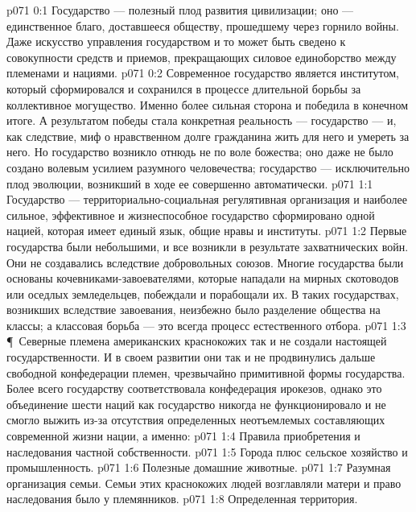 \vs p071 0:1 Государство --- полезный плод развития цивилизации; оно --- единственное благо, доставшееся обществу, прошедшему через горнило войны. Даже искусство управления государством и то может быть сведено к совокупности средств и приемов, прекращающих силовое единоборство между племенами и нациями.
\vs p071 0:2 Современное государство является институтом, который сформировался и сохранился в процессе длительной борьбы за коллективное могущество. Именно более сильная сторона и победила в конечном итоге. А результатом победы стала конкретная реальность --- государство --- и, как следствие, миф о нравственном долге гражданина жить для него и умереть за него. Но государство возникло отнюдь не по воле божества; оно даже не было создано волевым усилием разумного человечества; государство --- исключительно плод эволюции, возникший в ходе ее совершенно автоматически.
\vs p071 1:1 Государство --- территориально\hyp{}социальная регулятивная организация и наиболее сильное, эффективное и жизнеспособное государство сформировано одной нацией, которая имеет единый язык, общие нравы и институты.
\vs p071 1:2 Первые государства были небольшими, и все возникли в результате захватнических войн. Они не создавались вследствие добровольных союзов. Многие государства были основаны кочевниками\hyp{}завоевателями, которые нападали на мирных скотоводов или оседлых земледельцев, побеждали и порабощали их. В таких государствах, возникших вследствие завоевания, неизбежно было разделение общества на классы; а классовая борьба --- это всегда процесс естественного отбора.
\vs p071 1:3 \P\ Северные племена американских краснокожих так и не создали настоящей государственности. И в своем развитии они так и не продвинулись дальше свободной конфедерации племен, чрезвычайно примитивной формы государства. Более всего государству соответствовала конфедерация ирокезов, однако это объединение шести наций как государство никогда не функционировало и не смогло выжить из\hyp{}за отсутствия определенных неотъемлемых составляющих современной жизни нации, а именно:
\vs p071 1:4 \bibnobreakspace Правила приобретения и наследования частной собственности.
\vs p071 1:5 \bibnobreakspace Города плюс сельское хозяйство и промышленность.
\vs p071 1:6 \bibnobreakspace Полезные домашние животные.
\vs p071 1:7 \bibnobreakspace Разумная организация семьи. Семьи этих краснокожих людей возглавляли матери и право наследования было у племянников.
\vs p071 1:8 \bibnobreakspace Определенная территория.
